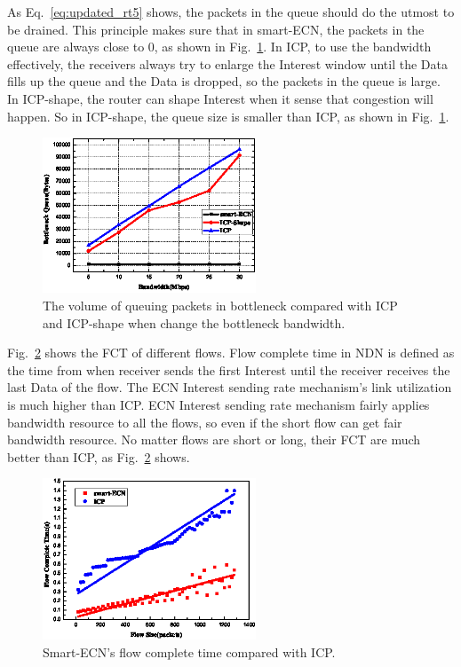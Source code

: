 As Eq.~\ref{eq:updated_rt5} shows, the packets in the queue should do the utmost to be drained. This principle makes sure that in smart-ECN, the packets in the queue are always close to 0, as shown in Fig.~\ref{fig-queue}. In ICP, to use the bandwidth effectively, the receivers always try to enlarge the Interest window until the Data fills up the queue and the Data is dropped, so the packets in the queue is large. In ICP-shape, the router can shape Interest when it sense that congestion will happen. So in ICP-shape, the queue size is smaller than ICP, as shown in Fig.~\ref{fig-queue}.

\begin{figure}[t]
	\centering
	\includegraphics[width=2.5in]{queu-pic-cut.eps}
	\caption{The volume of queuing packets in bottleneck compared with ICP and ICP-shape when change the bottleneck bandwidth.}
	\label{fig-queue}
\end{figure}

Fig.~\ref{fig-fct} shows the FCT of different flows. Flow complete time in NDN is defined as the time from when receiver sends the first Interest until the receiver receives the last Data of the flow. The ECN Interest sending rate mechanism's link utilization is much higher than ICP. ECN Interest sending rate mechanism fairly applies bandwidth resource to all the flows, so even if the short flow can get fair bandwidth resource. No matter flows are short or long, their FCT are much better than ICP, as Fig.~\ref{fig-fct} shows.

\begin{figure}[t]
	\centering
	\includegraphics[width=2.5in]{fct-cut.eps}
	\caption{Smart-ECN's flow complete time compared with ICP.}
	\label{fig-fct}
\end{figure}


